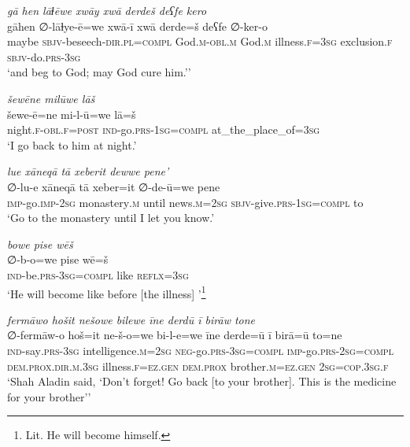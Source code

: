 \ea \label{DG.28}
\textit{gā hen lāɫēwe xwāy xwā derdeš deʕfe kero} \\ 
\gll gāhen ∅-lāɫye-ē=we xwā-ī xwā derde=š deʕfe ∅-ker-o \\ 
 maybe \textsc{sbjv-}beseech\textsc{-dir}\textsc{.pl}\textsc{=\textsc{compl}} God\textsc{.m}\textsc{-obl}\textsc{.m} God\textsc{.m} illness\textsc{\textsc{.f}}\textsc{=3sg} exclusion\textsc{\textsc{.f}} \textsc{sbjv-}do\textsc{.prs}\textsc{-3sg} \\ 
\glt `and beg to God; may God cure him.’'
\z 
 
\ea \label{DG.41}
\textit{šewēne milūwe lāš} \\ 
\gll šewe-ē=ne mi-l-ū=we lā=š \\ 
 night\textsc{\textsc{.f}}\textsc{-obl}\textsc{\textsc{.f}}\textsc{=\textsc{post}} \textsc{ind-}go\textsc{.prs}\textsc{-1sg}\textsc{=compl} at\_the\_place\_of\textsc{=3sg} \\ 
\glt `I go back to him at night.'
\z 
 
\ea \label{DG.45}
\textit{lue xāneqā tā xeberit dewwe pene’} \\ 
\gll ∅-lu-e xāneqā tā xeber=it ∅-de-ū=we pene \\ 
 \textsc{imp-}go.\textsc{imp-}\textsc{2sg} monastery\textsc{.m} until news\textsc{.m}\textsc{=\textsc{2sg}} \textsc{sbjv-}give\textsc{.prs}\textsc{-1sg}\textsc{=\textsc{compl}} to \\ 
\glt `Go to the monastery until I let you know.'
\z 
 
\ea \label{DG.52}
\textit{bowe pise wēš} \\ 
\gll ∅-b-o=we pise wē=š \\ 
 \textsc{ind-}be\textsc{.prs}\textsc{-3sg}\textsc{=\textsc{compl}} like \textsc{reflx}\textsc{=3sg} \\ 
\glt `He will become like before [the illness] '\footnote{Lit. He will become himself.}
\z 
 
\ea \label{DG.56}
\textit{fermāwo hošit nešowe bilewe īne derdū ī birāw tone} \\ 
\gll ∅-fermāw-o hoš=it ne-š-o=we bi-l-e=we īne derde=ū ī birā=ū to=ne \\ 
 \textsc{ind-}say\textsc{.prs}\textsc{-3sg} intelligence\textsc{.m}\textsc{=\textsc{2sg}} \textsc{neg-}go\textsc{.prs}\textsc{-3sg}\textsc{=\textsc{compl}} \textsc{imp-}go\textsc{.prs}-\textsc{2sg}\textsc{=compl} \textsc{dem.prox}\textsc{.dir}\textsc{.m}\textsc{.3sg} illness\textsc{\textsc{.f}}\textsc{=ez}\textsc{.gen} \textsc{dem.prox} brother\textsc{.m}\textsc{=ez}\textsc{.gen} \textsc{2sg}\textsc{=cop}\textsc{.3sg}\textsc{\textsc{.f}} \\ 
\glt `Shah Aladin said, ‘Don’t forget! Go back [to your brother]. This is the medicine for your brother’'
\z 
 
